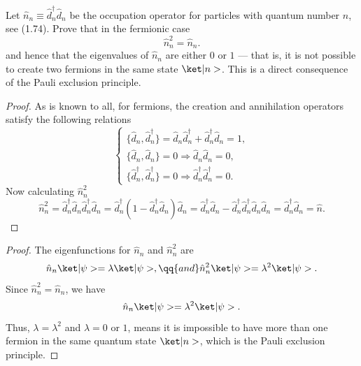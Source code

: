 \begin{problem}
  Let $\hat n_n \equiv \hat d_n^\dagger \hat d_n$
  be the occupation operator for particles with quantum number $n$, see (1.74).
  Prove that in the fermionic case
  \[
    \hat n_n^2 = \hat n_n.
  \]
  and hence that the eigenvalues of $\hat n_n$ are either $0$ or $1$ ---
  that is,
  it is not possible to create two fermions in the same state $\ket|n>$.
  This is a direct consequence of the Pauli exclusion principle.
\end{problem}
\begin{solution}
\begin{proof}
  As is known to all, for fermions,
  the creation and annihilation operators satisfy the following relations
  \[
    \begin{cases}
      \{\hat d_n, \hat d_n^\dagger\}
    = \hat d_n \hat d_n^\dagger + \hat d_n^\dagger \hat d_n = 1,\\
      \{\hat d_n, \hat d_n\} = 0 \Rightarrow \hat d_n \hat d_n = 0,\\
      \{\hat d_n^\dagger, \hat d_n^\dagger\} = 0
      \Rightarrow \hat d_n^\dagger \hat d_n^\dagger = 0.\
    \end{cases}
  \]
  Now calculating $\hat n_n^2$
  \[
    \hat n_n^2 = \hat d_n^\dagger \hat d_n \hat d_n^\dagger \hat d_n
  = \hat d_n^\dagger (1 - \hat d_n^\dagger \hat d_n) \hat d_n
  = \hat d_n^\dagger \hat d_n
  - \hat d_n^\dagger \hat d_n^\dagger \hat d_n \hat d_n
  = \hat d_n^\dagger \hat d_n = \hat n.
  \]
\end{proof}
\begin{proof}
  The eigenfunctions for $\hat n_n$ and $\hat n_n^2$ are
  \[
    \hat n_n \ket|\psi> = \lambda \ket|\psi>, \qq{and}
    \hat n_n^2 \ket|\psi> = \lambda^2 \ket|\psi>.
  \]
  Since $\hat n_n^2 = \hat n_n$, we have
  \[
    \hat n_n\ket|\psi> = \lambda^2 \ket|\psi>.
  \]
  Thus, $\lambda = \lambda^2$ and $\lambda = 0$ or $1$,
  means it is impossible to have more than one fermion
  in the same quantum state $\ket|n>$, which is the Pauli exclusion principle.
\end{proof}
\end{solution}

